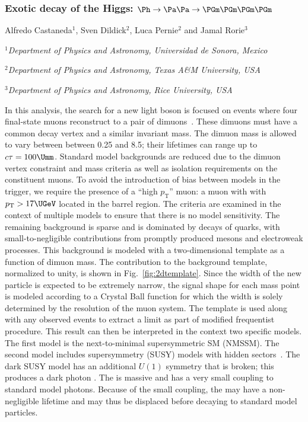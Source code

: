 \subsubsection{Exotic decay of the Higgs: $\Ph\to\Pa\Pa\to\PGm\PGm\PGm\PGm$}
\label{subsec:fourmu}

\begin{center}
 {Alfredo Castaneda$^{1}$, Sven Dildick$^{2}$, Luca Pernie$^{2}$ and Jamal Rorie$^{3}$ \\
}
\centerline{{\it  $^{1}$Department of Physics and Astronomy, Universidad de Sonora, Mexico}}
\centerline{{\it $^{2}$Department of Physics and Astronomy, Texas A\&M University, USA}}
\centerline{{\it  $^{3}$Department of Physics and Astronomy, Rice University, USA}}
\end{center}

In this analysis, the search for a new light boson is focused on events where four final-state muons reconstruct to a pair of dimuons~\cite{CMS-PAS-HIG-18-003}. These dimuons must have a common decay vertex and a similar invariant mass. The dimuon mass is allowed to vary between between 0.25 and 8.5\UGeV; their lifetimes can range up to $c\tau=100\Umm$. Standard model backgrounds are reduced due to the dimuon vertex constraint and mass criteria as well as isolation requirements on the constituent muons. To avoid the introduction of bias between models in the trigger, we require the presence of a ``high $p_\mathrm{T}$'' muon: a muon with with $p_\mathrm{T} > 17\UGeV$ located in the barrel region. The criteria are examined in the context of multiple models to ensure that there is no model sensitivity. The remaining background is sparse and is dominated by decays of \bbbar quarks, with small-to-negligible contributions from promptly produced \PJGy mesons and electroweak processes. This background is modeled with a two-dimensional template as a function of dimuon mass. The \bbbar contribution to the background template, normalized to unity, is shown in Fig.~\ref{fig:2dtemplate}. Since the width of the new particle is expected to be extremely narrow, the signal shape for each mass point is modeled according to a Crystal Ball \cite{Oreglia:1980cs} function for which the width is solely determined by the resolution of the muon system. The template is used along with any observed events to extract a limit as part of modified frequentist procedure. This result can then be interpreted in the context two specific models. The first model is the next-to-minimal supersymmetric SM (NMSSM). The second model includes supersymmetry (SUSY) models with hidden sectors~\cite{ArkaniHamed:2008qn, Baumgart:2009tn, Falkowski:2010cm}. The dark SUSY model has an additional $U(1)$ symmetry that is broken; this produces a dark photon \gammaDark. The \gammaDark is massive and has a very small coupling to standard model photons. Because of the small coupling, the \gammaDark may have a non-negligible lifetime and may thus be displaced before decaying to standard model particles.

